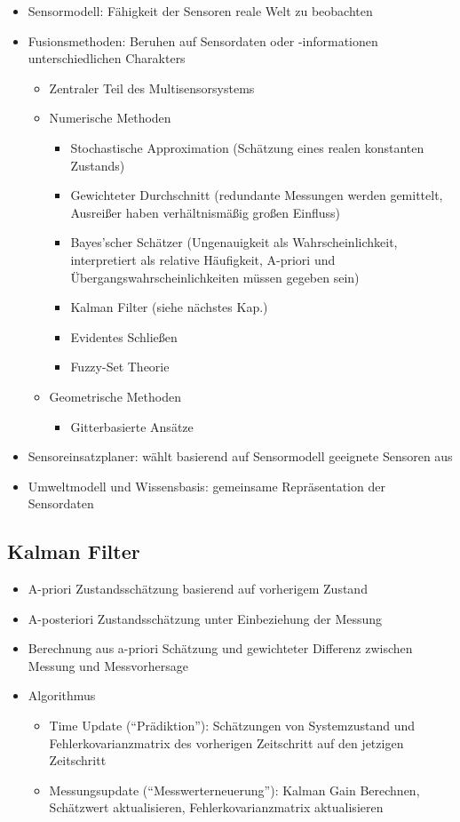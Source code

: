 \documentclass[paper=a4, fontsize=11pt]{scrartcl} %
\numberwithin{equation}{section} %
\numberwithin{figure}{section} %
\numberwithin{table}{section} %
\begin{document}
\begin{itemize}
\item Sensormodell: Fähigkeit der Sensoren reale Welt zu beobachten
\item Fusionsmethoden: Beruhen auf Sensordaten oder -informationen unterschiedlichen Charakters
\begin{itemize}
\item Zentraler Teil des Multisensorsystems
\item Numerische Methoden
\begin{itemize}
\item Stochastische Approximation (Schätzung eines realen konstanten Zustands)
\item Gewichteter Durchschnitt (redundante Messungen werden gemittelt, Ausreißer haben verhältnismäßig großen Einfluss)
\item Bayes'scher Schätzer (Ungenauigkeit als Wahrscheinlichkeit, interpretiert als relative Häufigkeit, A-priori und Übergangswahrscheinlichkeiten müssen gegeben sein)
\item Kalman Filter (siehe nächstes Kap.)
\item Evidentes Schließen
\item Fuzzy-Set Theorie
\end{itemize}
\item Geometrische Methoden
\begin{itemize}
\item Gitterbasierte Ansätze
\end{itemize}
\end{itemize}
\item Sensoreinsatzplaner: wählt basierend auf Sensormodell geeignete Sensoren aus
\item Umweltmodell und Wissensbasis: gemeinsame Repräsentation der Sensordaten
\end{itemize}

\subsection{Kalman Filter}

\begin{itemize}
\item A-priori Zustandsschätzung basierend auf vorherigem Zustand
\item A-posteriori Zustandsschätzung unter Einbeziehung der Messung
\item Berechnung aus a-priori Schätzung und gewichteter Differenz zwischen Messung und Messvorhersage
\item Algorithmus
\begin{itemize}
\item Time Update (``Prädiktion''): Schätzungen von Systemzustand und Fehlerkovarianzmatrix des vorherigen Zeitschritt auf den jetzigen Zeitschritt 
\item Messungsupdate (``Messwerterneuerung''): Kalman Gain Berechnen, Schätzwert aktualisieren, Fehlerkovarianzmatrix aktualisieren
\end{itemize}
\end{itemize}
\end{document}
